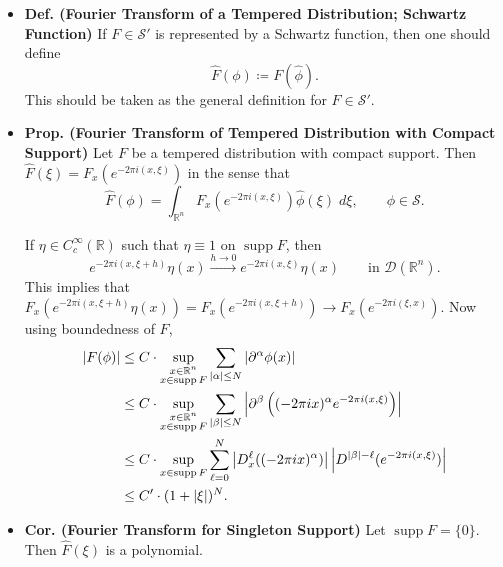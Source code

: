 \documentclass{article}
\begin{document}
\begin{itemize}
	\item \textbf{Def. (Fourier Transform of a Tempered Distribution; Schwartz Function)} If $F \in \mathcal{S}'$ is represented by a Schwartz function, then one should define 
		\begin{equation}
			\hat{F}(\phi) \coloneqq F(\hat{\phi}). 
		\end{equation}
	This should be taken as the general definition for $F \in \mathcal{S}'$. 
	
	\item \textbf{Prop. (Fourier Transform of Tempered Distribution with Compact Support)} Let $F$ be a tempered distribution with compact support. Then $\hat{F}(\xi) = F_{x}(e^{-2\pi i (x, \xi)})$ in the sense that 
		\begin{equation}
			\hat{F}(\phi) = \int_{\mathbb{R}^{n}}F_{x}\left(e^{-2\pi i (x, \xi)}\right)\hat{\phi}(\xi)\;d\xi, \qquad\phi \in \mathcal{S}. 
		\end{equation}
	\begin{solutions}
		If $\eta \in C_{c}^{\infty}(\mathbb{R})$ such that $\eta \equiv 1$ on $\operatorname{supp}{F}$, then 
			\begin{equation}
				e^{-2\pi i(x, \xi + h)}\eta(x) \xrightarrow{h \to 0} e^{-2\pi i (x, \xi)}\eta(x) \qquad \text{in $\mathcal{D}(\mathbb{R}^{n})$}. 
			\end{equation}
		This implies that $F_{x}(e^{-2\pi i (x, \xi + h)}\eta(x)) = F_{x}(e^{-2\pi i (x, \xi + h)}) \longrightarrow F_{x}(e^{-2\pi i (\xi, x)})$. Now using boundedness of $F$,
			\begin{align}
				\begin{split}
					\left| F(\phi) \right| &\leq C \cdot \sup_{\substack{x \in \mathbb{R}^{n} \\ x \in \operatorname{supp}{F}}}\sum_{|\alpha| \leq N}\left| \partial^{\alpha}\phi(x) \right| \\
					&\leq C \cdot \sup_{\substack{x \in \mathbb{R}^{n} \\ x \in \operatorname{supp}{F}}}\sum_{|\beta|\leq N}\left| \partial^{\beta}\left((-2\pi i x)^{\alpha}e^{-2\pi i (x, \xi)}\right) \right| \\ 
					&\leq C \cdot \sup_{x \in \operatorname{supp}{F}}\sum_{\ell = 0}^{N}\left| D_{x}^{\ell}((-2\pi i x)^{\alpha}) \right|\left| D^{|\beta| - \ell}(e^{-2\pi i (x, \xi)}) \right| \\
					&\leq C' \cdot (1 + |\xi|)^{N}. 
				\end{split}
			\end{align}
	\end{solutions}
	
	\item \textbf{Cor. (Fourier Transform for Singleton Support)} Let $\operatorname{supp}{F} = \{0\}$. Then $\hat{F}(\xi)$ is a polynomial. 
\end{itemize}
\end{document}
